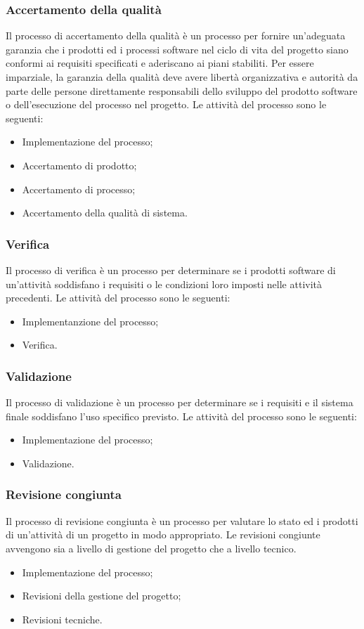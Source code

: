 \subsubsection{Accertamento della qualità}
Il processo di accertamento della qualità è un processo per fornire un'adeguata garanzia che i prodotti ed i processi software nel ciclo di vita del progetto siano conformi ai requisiti specificati e aderiscano ai piani stabiliti. Per essere imparziale, la garanzia della qualità deve avere libertà organizzativa e autorità da parte delle persone direttamente responsabili dello sviluppo del prodotto software o dell'esecuzione del processo nel progetto.
Le attività del processo sono le seguenti:
\begin{itemize}
\item Implementazione del processo;
\item Accertamento di prodotto;
\item Accertamento di processo;
\item Accertamento della qualità di sistema.
\end{itemize}
\subsubsection{Verifica}
Il processo di verifica è un processo per determinare se i prodotti software di un'attività soddisfano i requisiti o le condizioni loro imposti nelle attività precedenti.
Le attività del processo sono le seguenti:
\begin{itemize}
\item Implementanzione del processo;
\item Verifica.
\end{itemize}
\subsubsection{Validazione}
Il processo di validazione è un processo per determinare se i requisiti e il sistema finale soddisfano l'uso specifico previsto.
Le attività del processo sono le seguenti:
\begin{itemize}
\item Implementazione del processo;
\item Validazione.
\end{itemize}

\subsubsection{Revisione congiunta}
Il processo di revisione congiunta è un processo per valutare lo stato ed i prodotti di un'attività di un progetto in modo appropriato. Le revisioni congiunte avvengono sia a livello di gestione del progetto che a livello tecnico.
\begin{itemize}
\item Implementazione del processo;
\item Revisioni della gestione del progetto;
\item Revisioni tecniche.
\end{itemize}

